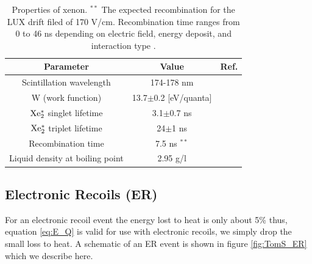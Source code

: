 \renewcommand{\baselinestretch}{1}
\small\normalsize
\begin{table}[h!]
\begin{center}
\begin{tabular}{|c|c|c|}
\hline
Parameter & Value & Ref.\\ \hline
Scintillation wavelength		& 174-178 nm 		&  \cite{Doke_Scintillation} \\ \hline
W (work function)				& 13.7$\pm$0.2 [eV/quanta]	&  \cite{Dahl_Thesis} \\ \hline
$\rm Xe^*_2$	singlet lifetime	& 3.1$\pm$0.7 ns			& \cite{Xe_singlet_tripplet_lifetime} \cite{Xe_Recombination_Time}  \cite{Mock}\\ \hline
$\rm Xe^*_2 $ triplet lifetime 	& 24$\pm$1 ns			&  \cite{Xe_singlet_tripplet_lifetime} \cite{Xe_Recombination_Time}  \cite{Mock}\\ \hline
Recombination time 			& 7.5 ns $^{**}$			 & \cite{Recomb_Time_Extraction} \cite{Mock}\\ \hline
Liquid density at boiling point	& 2.95 g/l 					& \cite{Xe_Density} \\ \hline
\end{tabular}
\caption{Properties of xenon. $^{**}$ The expected recombination for the LUX drift filed of 170 V/cm. Recombination time ranges from 0 to 46 ns depending on electric field, energy deposit, and interaction type \cite{Mock} \cite{Recomb_Time_Extraction}.}
\label{table:Xe_Properties}
\end{center}
\end{table}
\renewcommand{\baselinestretch}{2}
\small\normalsize


\subsection{Electronic Recoils (ER)}
For an electronic recoil event the energy lost to heat is only about 5\% \cite{FanoTheoretical} thus, equation \ref{eq:E_Q} is valid for use with electronic recoils, we simply drop the small loss to heat. A schematic of an ER event is shown in figure \ref{fig:TomS_ER} which we describe here.

